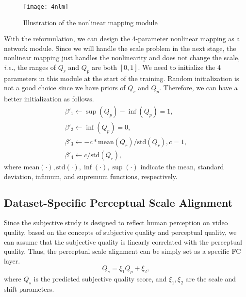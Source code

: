 \documentclass[twocolumn]{svjour3}          \smartqed  \usepackage{graphicx}
\begin{document}
\begin{figure}[!htb]
\begin{center}
\texttt{[image: 4nlm]}\end{center}
   \caption{Illustration of the nonlinear mapping module}
\label{fig:nlm}
\end{figure}

With the reformulation, we can design the 4-parameter nonlinear mapping as a network module.
Since we will handle the scale problem in the next stage, the nonlinear mapping just handles the nonlinearity and does not change the scale, \textit{i.e.}, the ranges of $Q_r$ and $Q_p$ are both $[0, 1]$. 
We need to initialize the 4 parameters in this module at the start of the training. 
Random initialization is not a good choice since we have priors of $Q_r$ and $Q_p$.
Therefore, we can have a better initialization as follows.
\begin{equation}\label{eq:nlm initialization}
\begin{array}{l}
\beta'_1\leftarrow \sup{(Q_p)}-\inf{(Q_p)} = 1, \\
\beta'_2\leftarrow \inf{(Q_p)} = 0, \\
\beta'_3\leftarrow-c*\mathrm{mean}{(Q_r)}/\mathrm{std}{(Q_r)}, c = 1, \\
\beta'_4\leftarrow c/\mathrm{std}{(Q_r)}, 
\end{array}
\end{equation}
where $\mathrm{mean}{(\cdot)}, \mathrm{std}{(\cdot)}, \inf{(\cdot)}, \sup{(\cdot)}$ indicate the mean, standard deviation, infimum, and supremum functions, respectively. 


\subsection{Dataset-Specific Perceptual Scale Alignment}
Since the subjective study is designed to reflect human perception on video quality, based on the concepts of subjective quality and perceptual quality, we can assume that the subjective quality is linearly correlated with the perceptual quality.
Thus, the perceptual scale alignment can be simply set as a specific FC layer.
\begin{equation}\label{eq:aligned}
Q_s  = \xi_1 Q_p + \xi_2,
\end{equation}
where $Q_s$ is the predicted subjective quality score, and $\xi_1, \xi_2$ are the scale and shift parameters. 
\end{document}
